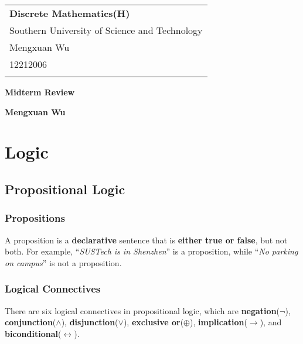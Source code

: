 \documentclass[a4paper,12pt]{article}
\begin{document}
\thispagestyle{empty} %

\begin{tabular}{p{15.5cm}}
{\large \bf Discrete Mathematics(H)} \\
Southern University of Science and Technology \\ Mengxuan Wu \\ 12212006 \\
\hline
\\
\end{tabular}

\vspace*{0.3cm} %

\begin{center}
	{\Large \bf Midterm Review}
	\vspace{2mm}

	{\bf Mengxuan Wu}
		
\end{center}  

\vspace{0.4cm}

\section{Logic}

\subsection{Propositional Logic}

\subsubsection{Propositions}
A proposition is a \textbf{declarative} sentence that is \textbf{either true or false}, but not both.
For example, ``\textit{SUSTech is in Shenzhen}'' is a proposition, while ``\textit{No parking on campus}'' is not a proposition.

\subsubsection{Logical Connectives}

There are six logical connectives in propositional logic, which are \textbf{negation}($\neg$), \textbf{conjunction}($\wedge$), \textbf{disjunction}($\vee$), \textbf{exclusive or}($\oplus$), \textbf{implication}($\rightarrow$), and \textbf{biconditional}($\leftrightarrow$).
\end{document}
